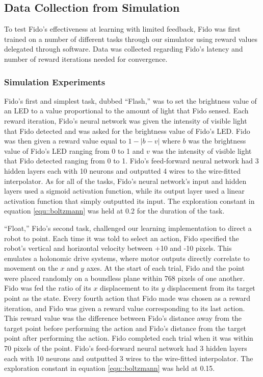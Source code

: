 \subsection{Data Collection from Simulation}

To test Fido's effectiveness at learning with limited feedback, Fido was first trained on a number of different tasks through our simulator using reward values delegated through software. Data was collected regarding Fido's latency and number of reward iterations needed for convergence.

\subsubsection{Simulation Experiments}

Fido's first and simplest task, dubbed ``Flash,'' was to set the brightness value of an LED to a value proportional to the amount of light that Fido sensed. Each reward iteration, Fido's neural network was given the intensity of visible light that Fido detected and was asked for the brightness value of Fido's LED. Fido was then given a reward value equal to $1 - |b - v|$ where $b$ was the brightness value of Fido's LED ranging from 0 to 1 and $v$ was the intensity of visible light that Fido detected ranging from 0 to 1. Fido's feed-forward neural network had 3 hidden layers each with 10 neurons and outputted 4 wires to the wire-fitted interpolator. As for all of the tasks, Fido's neural network's input and hidden layers used a sigmoid activation function, while  its output layer used a linear activation function that simply outputted its input. The exploration constant in equation \ref{equ::boltzmann} was held at 0.2 for the duration of the task.

``Float,'' Fido's second task, challenged our learning implementation to direct a robot to point. Each time it was told to select an action, Fido specified the robot's vertical and horizontal velocity between +10 and -10 pixels. This emulates a holonomic drive systems, where motor outputs directly correlate to movement on the $x$ and $y$ axes. At the start of each trial, Fido and the point were placed randomly on a boundless plane within 768 pixels of one another. Fido was fed the ratio of its $x$ displacement to its $y$ displacement from its target point as the state. Every fourth action that Fido made was chosen as a reward iteration, and Fido was given a reward value corresponding to its last action. This reward value was the difference between Fido's distance away from the target point before performing the action and Fido's distance from the target point after performing the action. Fido completed each trial when it was within 70 pixels of the point. Fido's feed-forward neural network had 3 hidden layers each with 10 neurons and outputted 3 wires to the wire-fitted interpolator. The exploration constant in equation \ref{equ::boltzmann} was held at 0.15.

